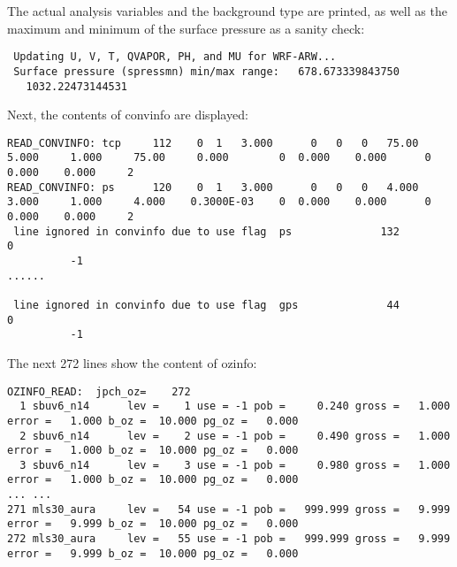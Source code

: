 The actual analysis variables and the background type are printed, as well as the maximum and minimum of the surface pressure as a sanity check:
\begin{scriptsize}
\begin{verbatim}
 Updating U, V, T, QVAPOR, PH, and MU for WRF-ARW...
 Surface pressure (spressmn) min/max range:   678.673339843750
   1032.22473144531
\end{verbatim}
\end{scriptsize}

Next, the contents of convinfo are displayed:
\begin{tiny}
\begin{verbatim}
READ_CONVINFO: tcp     112    0  1   3.000      0   0   0   75.00     5.000     1.000     75.00     0.000        0  0.000    0.000      0  0.000    0.000     2
READ_CONVINFO: ps      120    0  1   3.000      0   0   0   4.000     3.000     1.000     4.000    0.3000E-03    0  0.000    0.000      0  0.000    0.000     2
 line ignored in convinfo due to use flag  ps              132           0
          -1
......

 line ignored in convinfo due to use flag  gps              44           0
          -1
\end{verbatim}
\end{tiny}

The next 272 lines show the content of ozinfo:
\begin{scriptsize}
\begin{verbatim}
OZINFO_READ:  jpch_oz=    272
  1 sbuv6_n14      lev =    1 use = -1 pob =     0.240 gross =   1.000 error =   1.000 b_oz =  10.000 pg_oz =   0.000
  2 sbuv6_n14      lev =    2 use = -1 pob =     0.490 gross =   1.000 error =   1.000 b_oz =  10.000 pg_oz =   0.000
  3 sbuv6_n14      lev =    3 use = -1 pob =     0.980 gross =   1.000 error =   1.000 b_oz =  10.000 pg_oz =   0.000
... ...
271 mls30_aura     lev =   54 use = -1 pob =   999.999 gross =   9.999 error =   9.999 b_oz =  10.000 pg_oz =   0.000
272 mls30_aura     lev =   55 use = -1 pob =   999.999 gross =   9.999 error =   9.999 b_oz =  10.000 pg_oz =   0.000
\end{verbatim}
\end{scriptsize}

